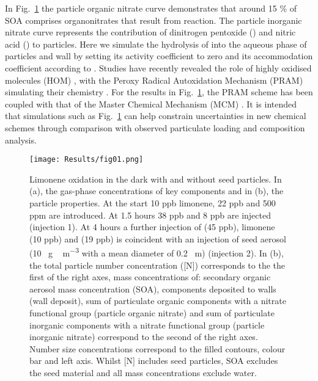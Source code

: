 \documentclass[gmd, manuscript]{copernicus}
\begin{document}
In Fig.~\ref{fig:limonene_output_plot} the particle organic nitrate curve demonstrates that around 15 \% of SOA comprises organonitrates that result from  reaction.  The particle inorganic nitrate curve represents the contribution of dinitrogen pentoxide () and nitric acid () to particles.  Here we simulate the hydrolysis of  into the aqueous phase of particles and wall by setting its activity coefficient to zero and its accommodation coefficient according to \citet{Lowe2015}.  Studies have recently revealed the role of highly oxidised molecules (HOM) \citep{Ehn2014}, with the Peroxy Radical Autoxidation Mechanism (PRAM) simulating their chemistry \citep{Roldin2019}.  For the results in Fig.~\ref{fig:limonene_output_plot}, the PRAM scheme has been coupled with that of the Master Chemical Mechanism (MCM) \citep{Jenkin1997, Saunders2003}.  It is intended that simulations such as Fig.~\ref{fig:limonene_output_plot} can help constrain uncertainties in new chemical schemes through comparison with observed particulate loading and composition analysis.

\begin{figure}[t]
\texttt{[image: Results/fig01.png]}
\caption{Limonene oxidation in the dark with and without seed particles.  In (a), the gas-phase concentrations of key components and in (b), the particle properties.  At the start 10 \unit{ppb} limonene, 22 \unit{ppb}  and 500 \unit{ppm}  are introduced.  At 1.5 hours 38 \unit{ppb}  and 8 \unit{ppb}  are injected (injection 1).  At 4 hours a further injection of  (45 \unit{ppb}), limonene (10 \unit{ppb}) and  (19 \unit{ppb}) is coincident with an injection of seed aerosol (10 \unit{\mu g\, m^{-3}} with a mean diameter of 0.2 \unit{\mu m}) (injection 2).  In (b), the total particle number concentration ([N]) corresponds to the the first of the right axes,  mass concentrations of: secondary organic aerosol mass concentration (SOA), components deposited to walls (wall deposit), sum of particulate organic components with a nitrate functional group (particle organic nitrate) and sum of particulate inorganic components with a nitrate functional group (particle inorganic nitrate) correspond to the second of the right axes.  Number size concentrations correspond to the filled contours, colour bar and left axis.  Whilst [N] includes seed particles, SOA excludes the seed material and all mass concentrations exclude water.}
\label{fig:limonene_output_plot}
\end{figure}
\end{document}
